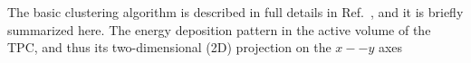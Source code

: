 The basic clustering algorithm is described in full details in
Ref.~\cite{iDBSCAN}, and it is briefly summarized here.
The energy deposition pattern in the active volume of the TPC,
and thus its two-dimensional (2D) projection on the $x--y$ axes 
